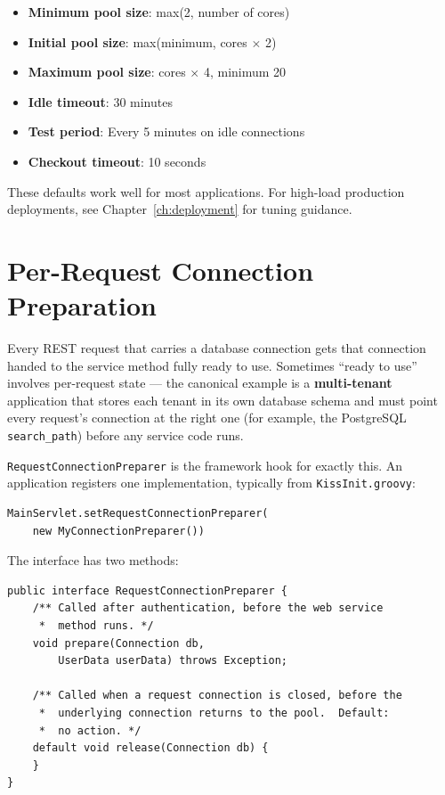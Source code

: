 \begin{itemize}
  \item \textbf{Minimum pool size}: max(2, number of cores)
  \item \textbf{Initial pool size}: max(minimum, cores $\times$ 2)
  \item \textbf{Maximum pool size}: cores $\times$ 4, minimum 20
  \item \textbf{Idle timeout}: 30 minutes
  \item \textbf{Test period}: Every 5 minutes on idle connections
  \item \textbf{Checkout timeout}: 10 seconds
\end{itemize}

\noindent
These defaults work well for most applications.  For high-load production deployments, see Chapter~\ref{ch:deployment} for tuning guidance.

\section{Per-Request Connection Preparation}
\label{sec:db-request-preparer}

Every REST request that carries a database connection gets that connection handed to the service method fully ready to use.  Sometimes ``ready to use'' involves per-request state --- the canonical example is a \textbf{multi-tenant} application that stores each tenant in its own database schema and must point every request's connection at the right one (for example, the PostgreSQL \texttt{search\_path}) before any service code runs.

\texttt{RequestConnectionPreparer} is the framework hook for exactly this.  An application registers one implementation, typically from \texttt{KissInit.groovy}:

\begin{lstlisting}[style=groovy]
MainServlet.setRequestConnectionPreparer(
    new MyConnectionPreparer())
\end{lstlisting}

\noindent
The interface has two methods:

\begin{lstlisting}[style=java]
public interface RequestConnectionPreparer {
    /** Called after authentication, before the web service
     *  method runs. */
    void prepare(Connection db,
        UserData userData) throws Exception;

    /** Called when a request connection is closed, before the
     *  underlying connection returns to the pool.  Default:
     *  no action. */
    default void release(Connection db) {
    }
}
\end{lstlisting}

